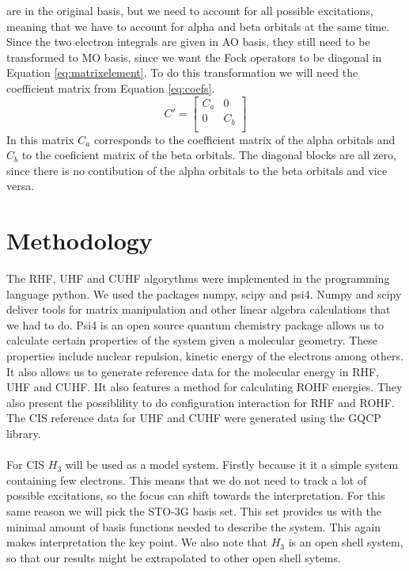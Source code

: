 \documentclass[twoside,twocolumn,9pt]{article}
\begin{document}
are in the original basis, but we need to account for all possible excitations, meaning that we have to account for alpha and beta orbitals at the same time. Since the two electron
integrals are given in AO basis, they still need to be transformed to MO basis, since we want the Fock operators to be diagonal in Equation \eqref{eq:matrixelement}. To do this
transformation we will need the coefficient matrix from Equation \eqref{eq:coefs}.
\begin{equation}\label{eq:coefs}
  C' = \begin{bmatrix}
    C_a & 0   \\
    0   & C_b \\
  \end{bmatrix}
\end{equation}
In this matrix $C_a$ corresponds to the coefficient matrix of the alpha orbitals and $C_b$ to the coeficient matrix of the beta orbitals. The diagonal blocks are all zero, since there
is no contibution of the alpha orbitals to the beta orbitals and vice versa.


\section{Methodology}
\label{sec:method}
The RHF, UHF and CUHF algorythms were implemented in the programming language python. We used the packages numpy, scipy and psi4. Numpy and scipy deliver tools for matrix manipulation
and other linear algebra calculations that we had to do. Psi4 is an open source quantum chemistry package allows us to calculate certain properties of the system given a molecular
geometry. These properties include nuclear repulsion, kinetic energy of the electrons among others. It also allows us to generate reference data for the molecular energy in RHF, UHF
and CUHF. IIt also features a method for calculating ROHF energies. They also present the possiblility to do configuration interaction for RHF and ROHF. The CIS reference data for
UHF and CUHF were generated using the GQCP library.
\paragraph*{}
For CIS $H_3$ will be used as a model system. Firstly because it it a simple system containing few electrons. This means that we do not need to track a lot of possible excitations, so
the focus can shift towards the interpretation. For this same reason we will pick the STO-3G basis set. This set provides us with the minimal amount of basis functions needed to
describe the system. This again makes interpretation the key point. We also note that $H_3$ is an open shell system, so that our results might be extrapolated to other open shell
sytems.
\end{document}
